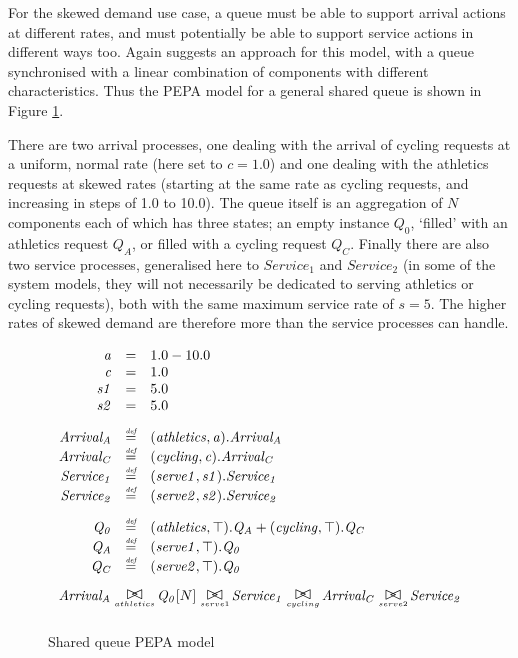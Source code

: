 For the skewed demand use case, a queue must be able to support arrival actions at different rates, and must potentially be able to support service actions in different ways too.  Again \cite{RN75} suggests an approach for this model, with a queue synchronised with a linear combination of components with different characteristics.  Thus the PEPA model for a general shared queue is shown in Figure \ref{figure:pepa_queue_model}.

There are two arrival processes, one dealing with the arrival of cycling requests at a uniform, normal rate (here set to $\mathit{c=1.0}$) and one dealing with the athletics requests at skewed rates (starting at the same rate as cycling requests, and increasing in steps of 1.0 to 10.0).  The queue itself is an aggregation of $\mathit{N}$ components each of which has three states; an empty instance $\mathit{Q_0}$, `filled' with an athletics request $\mathit{Q_A}$, or filled with a cycling request $\mathit{Q_C}$.  Finally there are also two service processes, generalised here to $\mathit{Service_1}$ and $\mathit{Service_2}$ (in some of the system models, they will not necessarily be dedicated to serving athletics or cycling requests), both with the same maximum service rate of $\mathit{s=5}$.  The higher rates of skewed demand are therefore more than the service processes can handle.

\begin{figure}
	\centering
	\begin{displaymath}
		\begin{array}{rcl}
			\mathit{a} & = & 1.0-10.0\\
			\mathit{c} & = & 1.0\\
			\mathit{s1} & = & 5.0\\
			\mathit{s2} & = & 5.0\\
			[2.0ex]		\mathit{Arrival_A} & \rmdef & (\mathit{athletics},\mathit{a}).\mathit{Arrival_A}\\
			\mathit{Arrival_C} & \rmdef & (\mathit{cycling},\mathit{c}).\mathit{Arrival_C}\\
			\mathit{Service_1} & \rmdef & (\mathit{serve1},\mathit{s1}).\mathit{Service_1}\\
			\mathit{Service_2} & \rmdef & (\mathit{serve2},\mathit{s2}).\mathit{Service_2}\\
			[2.0ex]		\mathit{Q_0} & \rmdef & (\mathit{athletics},\top).\mathit{Q_A}+(\mathit{cycling},\top).\mathit{Q_C}\\
			\mathit{Q_A} & \rmdef & (\mathit{serve1},\top).\mathit{Q_0}\\
			\mathit{Q_C} & \rmdef & (\mathit{serve2},\top).\mathit{Q_0}\\
			[2.0ex]		\multicolumn{3}{l}{\mathit{Arrival_A}\sync{athletics}\mathit{Q_0}[N]\sync{serve1}\mathit{Service_1}\sync{cycling}\mathit{Arrival_C}\sync{serve2}\mathit{Service_2}}\\
			[2.0ex]	\end{array}
	\end{displaymath}
	\caption{Shared queue PEPA model}
	\label{figure:pepa_queue_model}
\end{figure}

